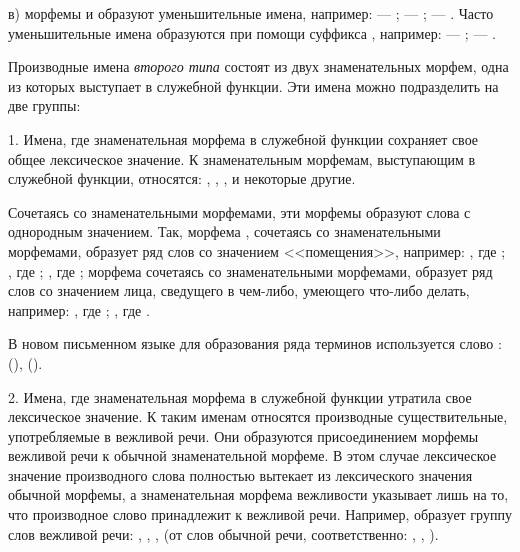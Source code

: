 в) морфемы  и  образуют уменьшительные имена, например:
 --- ;
 --- ;
 --- .
Часто уменьшительные имена образуются при помощи суффикса , например:
 --- ;
 --- .

Производные имена \emph{второго типа} состоят из двух знаменательных морфем, одна из которых выступает в служебной функции. Эти имена можно подразделить на две группы:

1. Имена, где знаменательная морфема в служебной функции сохраняет свое общее лексическое значение. К знаменательным морфемам, выступающим в служебной функции, относятся:
, , ,  и некоторые другие.

Сочетаясь со знаменательными морфемами, эти морфемы образуют слова с однородным значением. Так, морфема , сочетаясь со знаменательными морфемами, образует ряд слов со значением <<помещения>>, например:
, где ;
, где ;
, где ;
морфема  сочетаясь со знаменательными морфемами, образует ряд слов со значением лица, сведущего в чем-либо, умеющего что-либо делать, например:
, где ;
, где .

В новом письменном языке для образования ряда терминов используется слово :
 (),  ().

2. Имена, где знаменательная морфема в служебной функции утратила свое лексическое значение. К таким именам относятся производные существительные, употребляемые в вежливой речи. Они образуются присоединением морфемы вежливой речи к обычной знаменательной морфеме. В этом случае лексическое значение производного слова полностью вытекает из лексического значения обычной морфемы, а знаменательная морфема вежливости указывает лишь на то, что производное слово принадлежит к вежливой речи. Например,	 образует группу слов вежливой речи:
,
,
,
(от слов обычной речи, соответственно: ,
, ).


